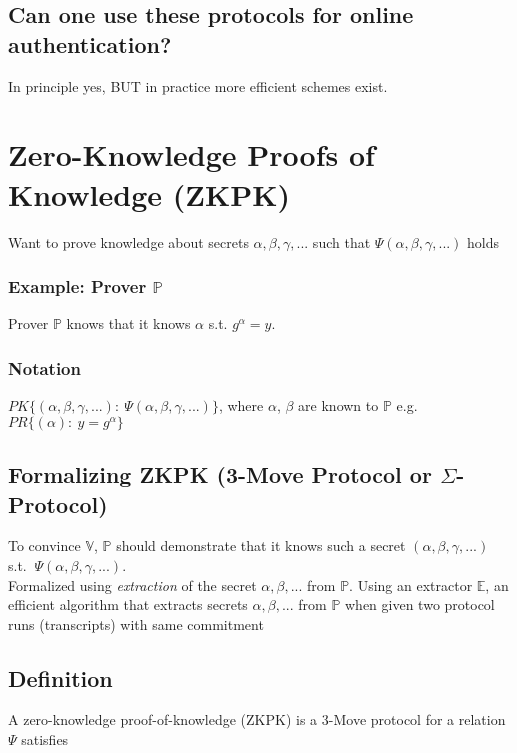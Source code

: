 \documentclass{report}
\begin{document}
		\subsection{Can one use these protocols for online authentication?}
		\subsectionstart
			In principle yes, BUT in practice more efficient schemes exist.
		\sectionend
	\sectionend
	
	\section{Zero-Knowledge Proofs of Knowledge (ZKPK)}
	\sectionstart
		Want to prove knowledge about secrets $\alpha, \beta, \gamma, ...$ such that $\Psi (\alpha, \beta, \gamma, ...)$ holds
		\subsubsection{Example: Prover $\mathbb{P}$}
		\subsectionstart
			Prover $\mathbb{P}$ knows that it knows $\alpha$ s.t. $g^{\alpha} = y$.
		\sectionend
		\subsubsection{Notation}
		\subsectionstart
			$PK \{ (\alpha, \beta, \gamma, ...): \ \Psi (\alpha, \beta, \gamma, ...)\}$, where $\alpha$, $\beta$ are known to $\mathbb{P}$ e.g. $PR\{ (\alpha): \ y = g^{\alpha} \} $
		\sectionend
		\subsection{Formalizing ZKPK (3-Move Protocol or $\Sigma$-Protocol)}
		\sectionstart
			\begin{tikzpicture}
			\end{tikzpicture}
			To convince $\mathbb{V}$, $\mathbb{P}$ should demonstrate that it knows such a secret $(\alpha, \beta, \gamma, ...)$ s.t. $\ \Psi (\alpha, \beta, \gamma, ...)$. \\
			Formalized using \textit{extraction} of the secret $\alpha, \beta, ...$ from $\mathbb{P}$. Using an extractor $\mathbb{E}$, an efficient algorithm that extracts secrets $\alpha, \beta, ...$ from $\mathbb{P}$ when given two protocol runs (transcripts) with same commitment
		\sectionend
		\subsection{Definition}
		\subsectionstart
			A zero-knowledge proof-of-knowledge (ZKPK) is a 3-Move protocol for a relation $\Psi$ satisfies
\end{document}

